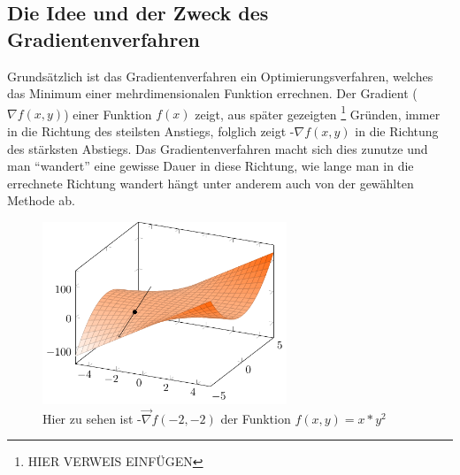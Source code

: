 \documentclass[naustrian]{article}
\begin{document}
{\subsection{Die Idee und der Zweck des Gradientenverfahren}

Grundsätzlich ist das Gradientenverfahren ein Optimierungsverfahren, welches
das Minimum einer mehrdimensionalen Funktion errechnen. Der Gradient
(${\nabla}f(x,y)$) einer Funktion \(f(x)\) zeigt, aus später gezeigten
\footnote{HIER VERWEIS EINFÜGEN} Gründen, immer in die Richtung des steilsten
Anstiegs, folglich zeigt -${\nabla}f(x,y)$ in die Richtung des stärksten
Abstiegs. Das Gradientenverfahren macht sich dies zunutze und man ``wandert''
eine gewisse Dauer in diese Richtung, wie \textquotedbl{}lange\textquotedbl{}
man in die errechnete Richtung \textquotedbl{}wandert\textquotedbl{} hängt
unter anderem auch von der gewählten Methode ab.

\begin{figure}[h]
    \centering
    \includegraphics[width=0.65\textwidth]{grad/figure0}
    \caption[Gradientenvektor Beispiel] {Hier zu sehen ist -$\vec{\nabla}f(-2,-2)$ der Funktion $f(x,y)=x*y^2$}
\end{figure}

}
\end{document}
